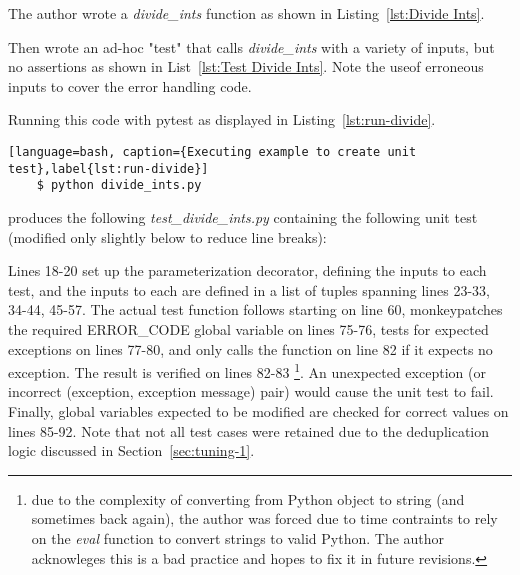 The author wrote a \textit{divide\_ints} function as shown 
in Listing~\ref{lst:Divide Ints}.



Then wrote an ad-hoc "test" that calls 
\textit{divide\_ints} with a variety of inputs, but no assertions
as shown in List~\ref{lst:Test Divide Ints}.  Note the useof erroneous inputs
to cover the error handling code.



Running this code with pytest as displayed in Listing~\ref{lst:run-divide}.

\begin{lstlisting}[language=bash, caption={Executing example to create unit test},label{lst:run-divide}]
    $ python divide_ints.py
\end{lstlisting}
    
produces the following \textit{test\_divide\_ints.py} containing the following 
unit test (modified only slightly below to reduce line breaks):



Lines 18-20 set up the parameterization decorator, defining the inputs to each test,
and the inputs to each are defined in a list of tuples spanning lines 23-33, 
34-44, 45-57.  The actual test function follows starting on line 60, monkeypatches
the required ERROR\_CODE global variable on lines 75-76, tests for expected 
exceptions on lines 77-80, and only calls the function on line 82 if it expects 
no exception. The result is verified on lines 82-83
\footnote{due to the complexity of converting from Python object to string
(and sometimes back again), the author was forced due to time contraints to
rely on the \textit{eval} function to convert strings to valid Python.  
The author acknowleges this is a bad practice and hopes to fix it in
future revisions.}. An unexpected exception (or incorrect 
(exception, exception message) 
pair) would cause the unit test to fail.  Finally, global variables expected to be modified 
are checked for correct values on lines 85-92.  Note that not all test cases 
were retained due to the deduplication logic discussed in Section~\ref{sec:tuning-1}.

